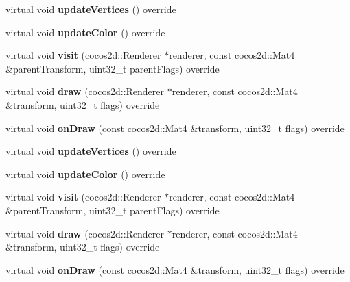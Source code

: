 \begin{DoxyCompactItemize}
\item 
\mbox{\label{classSkeletonNode_a4acb0ab12a010d56e724375ea3222c6e}} 
virtual void {\bfseries update\+Vertices} () override
\item 
\mbox{\label{classSkeletonNode_a8e2edfe3d0e28c26ea5f3c3ed0bde260}} 
virtual void {\bfseries update\+Color} () override
\item 
\mbox{\label{classSkeletonNode_a90f778cf69f6c4e0ab27de81cb328561}} 
virtual void {\bfseries visit} (cocos2d\+::\+Renderer $\ast$renderer, const cocos2d\+::\+Mat4 \&parent\+Transform, uint32\+\_\+t parent\+Flags) override
\item 
\mbox{\label{classSkeletonNode_adc1ecc5a05d09618018b733e0b134f80}} 
virtual void {\bfseries draw} (cocos2d\+::\+Renderer $\ast$renderer, const cocos2d\+::\+Mat4 \&transform, uint32\+\_\+t flags) override
\item 
\mbox{\label{classSkeletonNode_a02c03c4af3129473d858f722308ad232}} 
virtual void {\bfseries on\+Draw} (const cocos2d\+::\+Mat4 \&transform, uint32\+\_\+t flags) override
\item 
\mbox{\label{classSkeletonNode_a3fb25648db4816fca99c22dbc8597bb0}} 
virtual void {\bfseries update\+Vertices} () override
\item 
\mbox{\label{classSkeletonNode_ade969415500d358d55c4222abb3b831a}} 
virtual void {\bfseries update\+Color} () override
\item 
\mbox{\label{classSkeletonNode_aac72b23514ddab2017d29101210bb6ea}} 
virtual void {\bfseries visit} (cocos2d\+::\+Renderer $\ast$renderer, const cocos2d\+::\+Mat4 \&parent\+Transform, uint32\+\_\+t parent\+Flags) override
\item 
\mbox{\label{classSkeletonNode_aa8a28bf53ee469a9383e681c219613de}} 
virtual void {\bfseries draw} (cocos2d\+::\+Renderer $\ast$renderer, const cocos2d\+::\+Mat4 \&transform, uint32\+\_\+t flags) override
\item 
\mbox{\label{classSkeletonNode_a536bb8febdc8ba2a5e6b8eaae2fc7fde}} 
virtual void {\bfseries on\+Draw} (const cocos2d\+::\+Mat4 \&transform, uint32\+\_\+t flags) override
\end{DoxyCompactItemize}
